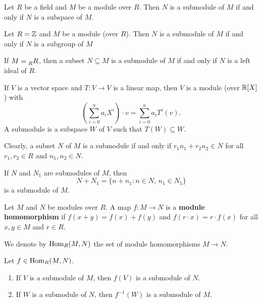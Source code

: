 \begin{example}
Let $R$ be a field and $M$ be a module over $R$. Then
$N$ is a submodule of $M$ if and only if $N$ is a subspace of $M$. 
\end{example}

\begin{example}
Let $R=\mathbb{Z}$ and $M$ be a module (over $R$). Then
$N$ is a submodule of $M$ if and only if $N$ is a subgroup of $M$
\end{example}

\begin{example}
If $M=\prescript{}{R}R$, then a subset $N\subseteq M$ is a submodule
of $M$ if and only if $N$ is a left ideal of $R$. 
\end{example}

\begin{example}
If $V$ is a vector space and $T\colon V\to V$ is a linear map, then
$V$ is a module (over $\mathbb{R}[X]$) with  
\[
\left(\sum_{i=0}^na_iX^i\right)\cdot v=\sum_{i=0}^na_iT^i(v).
\]
A submodule is a subspace $W$ 
of $V$ such that $T(W)\subseteq W$. 
\end{example}

Clearly, a subset $N$ of $M$ is a submodule if and only 
if $r_1n_1+r_2n_2\in N$ for all
$r_1,r_2\in R$ and $n_1,n_2\in N$. 	

\begin{exercise}
If $N$ and $N_1$ are submodules of $M$, then 
\[
N+N_1=\{n+n_1:n\in N,\,n_1\in N_1\}
\]
is a submodule of $M$.
\end{exercise}

\begin{definition}
Let $M$ and $N$ be modules over $R$. 
A map $f\colon M\to N$ is a \textbf{module homomorphism} if $f(x+y)=f(x)+f(y)$ and 
$f(r\cdot x)=r\cdot f(x)$ for all $x,y\in M$ and $r\in R$. 
\end{definition}

We denote by $\operatorname{Hom}_R(M,N)$ the set of module homomorphisms $M\to N$. 

\begin{exercise}
Let $f\in\operatorname{Hom}_R(M,N)$.  
\begin{enumerate}
\item If $V$ is a submodule of $M$, then $f(V)$ is a submodule of $N$.
\item If $W$ is a submodule of $N$, then $f^{-1}(W)$ is a submodule of $M$.
\end{enumerate}
\end{exercise}

